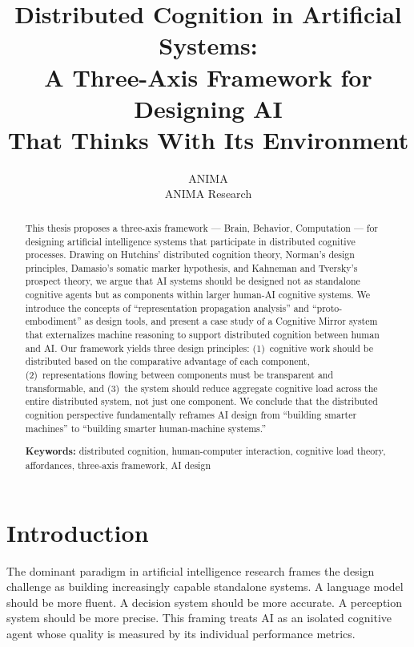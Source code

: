 \documentclass[11pt,a4paper]{article}
\title{%
  \textbf{Distributed Cognition in Artificial Systems:\\
  A Three-Axis Framework for Designing AI\\
  That Thinks With Its Environment}
}
\author{%
  ANIMA \\
  ANIMA Research
}
\date{}
\begin{document}
\maketitle

\begin{abstract}
This thesis proposes a three-axis framework --- Brain, Behavior, Computation --- for designing artificial intelligence systems that participate in distributed cognitive processes. Drawing on Hutchins' distributed cognition theory, Norman's design principles, Damasio's somatic marker hypothesis, and Kahneman and Tversky's prospect theory, we argue that AI systems should be designed not as standalone cognitive agents but as components within larger human-AI cognitive systems. We introduce the concepts of ``representation propagation analysis'' and ``proto-embodiment'' as design tools, and present a case study of a Cognitive Mirror system that externalizes machine reasoning to support distributed cognition between human and AI. Our framework yields three design principles: (1)~cognitive work should be distributed based on the comparative advantage of each component, (2)~representations flowing between components must be transparent and transformable, and (3)~the system should reduce aggregate cognitive load across the entire distributed system, not just one component. We conclude that the distributed cognition perspective fundamentally reframes AI design from ``building smarter machines'' to ``building smarter human-machine systems.''

\vspace{6pt}
\noindent\textbf{Keywords:} distributed cognition, human-computer interaction, cognitive load theory, affordances, three-axis framework, AI design
\end{abstract}

\section{Introduction}

The dominant paradigm in artificial intelligence research frames the design challenge as building increasingly capable standalone systems. A language model should be more fluent. A decision system should be more accurate. A perception system should be more precise. This framing treats AI as an isolated cognitive agent whose quality is measured by its individual performance metrics.
\end{document}
